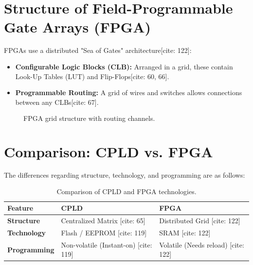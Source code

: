 \documentclass[12pt,a4paper]{article}
\begin{document}
\section{Structure of Field-Programmable Gate Arrays (FPGA)}
FPGAs use a distributed "Sea of Gates" architecture[cite: 122]:
\begin{itemize}
    \item \textbf{Configurable Logic Blocks (CLB):} Arranged in a grid, these contain Look-Up Tables (LUT) and Flip-Flops[cite: 60, 66].
    \item \textbf{Programmable Routing:} A grid of wires and switches allows connections between any CLBs[cite: 67].
\end{itemize}



\begin{figure}[ht]
\centering
{}
\caption{FPGA grid structure with routing channels.}
\end{figure}

\section{Comparison: CPLD vs. FPGA}
The differences regarding structure, technology, and programming are as follows:

\begin{table}[ht]
\centering
\begin{tabular}{@{}lll@{}}
\toprule
\textbf{Feature} & \textbf{CPLD} & \textbf{FPGA} \\ \midrule
\textbf{Structure} & Centralized Matrix [cite: 65] & Distributed Grid [cite: 122] \\
\textbf{Technology} & Flash / EEPROM [cite: 119] & SRAM [cite: 122] \\
\textbf{Programming} & Non-volatile (Instant-on) [cite: 119] & Volatile (Needs reload) [cite: 122] \\
\bottomrule
\end{tabular}
\caption{Comparison of CPLD and FPGA technologies.}
\end{table}
\end{document}
